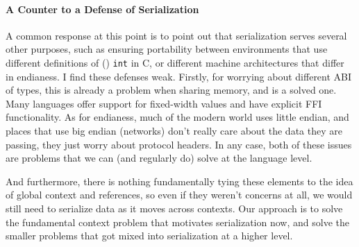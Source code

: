 \paragraph{A Counter to a Defense of Serialization}

A common response at this point is to point out that serialization serves several other purposes, such as ensuring
portability between environments that use different definitions of (\eg) \texttt{int} in C, or different machine
architectures that differ in endianess. I find these defenses weak. Firstly, for worrying about different ABI of types,
this is already a problem when sharing memory, and is a solved one. Many languages offer support for fixed-width values
and have explicit FFI functionality. As for endianess, much of the modern world uses little endian, and places that use big endian (networks) don't
really care about the data they are passing, they just worry about protocol headers. In any case, both of these issues
are problems that we can (and regularly do) solve at the language level.

And furthermore, there is nothing fundamentally tying these elements to the idea of global context and references, so
even if they weren't concerns at all, we would still need to serialize data as it moves across contexts. Our approach
is to solve the fundamental context problem that motivates serialization now, and solve the smaller problems that got
mixed into serialization at a higher level.

